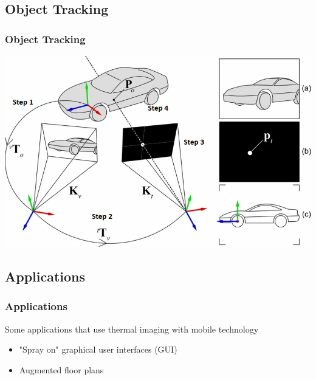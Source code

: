 \documentclass{beamer}
\begin{document}
\subsection{Object Tracking}
\begin{frame}	
\frametitle{Object Tracking}
	\includegraphics[width=\textwidth]{images/Tracking}
\end{frame}



\subsection{Applications}

\begin{frame}
	\frametitle{Applications}
	Some applications that use thermal imaging with mobile technology 
	\begin{itemize}
		\item "Spray on" graphical user interfaces (GUI)
		\item Augmented floor plans
	\end{itemize}
\end{frame}
\end{document}
